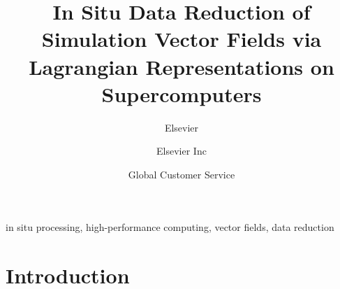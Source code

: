 \documentclass[review]{elsarticle}
\begin{document}
\begin{frontmatter}

\title{In Situ Data Reduction of Simulation Vector Fields via Lagrangian Representations on Supercomputers}

\author{Elsevier}
\address{Radarweg 29, Amsterdam}

\author[mymainaddress,mysecondaryaddress]{Elsevier Inc}

\author[mysecondaryaddress]{Global Customer Service}

\address[mymainaddress]{1600 John F Kennedy Boulevard, Philadelphia}
\address[mysecondaryaddress]{360 Park Avenue South, New York}

\begin{abstract}

\end{abstract}

\begin{keyword}
in situ processing, high-performance computing, vector fields, data reduction
\end{keyword}

\end{frontmatter}

\linenumbers

\section{Introduction}


\end{document}
